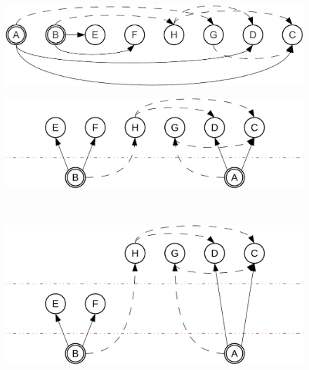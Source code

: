 
\begin{figure}[th!b]
  \vspace{-5mm}
  \begin{minipage}[b]{0.5\linewidth}
    \centering
    \includegraphics[scale=0.4]{figures/complementation/steps-0.pdf}
    \label{hiercomp/fig:multiple:steps:0}
  \end{minipage}
  \begin{minipage}[b]{0.5\linewidth}
    \centering
    \includegraphics[scale=0.4]{figures/complementation/steps-1.pdf}
    \label{hiercomp/fig:multiple:steps:1}
  \end{minipage}
  \vspace{0mm}                  %
  \\
  \begin{minipage}[b]{0.5\linewidth}
    \centering
    \includegraphics[scale=0.4]{figures/complementation/steps-2.pdf}
    \label{hiercomp/fig:multiple:steps:2}
  \end{minipage}
  \begin{minipage}[b]{0.5\linewidth}

\end{minipage}
\end{figure}
